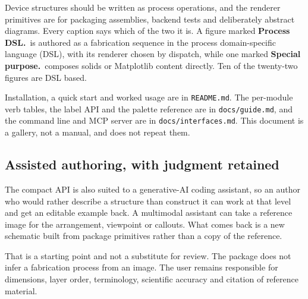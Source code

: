 \documentclass[11pt]{article}
\newcommand{\packagefile}[1]{\texttt{#1}}
\newcommand{\kinddsl}{\textcolor{lineblue}{\textbf{Process DSL.}}\ }
\newcommand{\kindspecial}{\textcolor{slate}{\textbf{Special purpose.}}\ }
\begin{document}
Device structures should be written as process operations, and the renderer
primitives are for packaging assemblies, backend tests and deliberately
abstract diagrams. Every caption says which of the two it is. A figure marked
\kinddsl is authored as a fabrication sequence in the process domain-specific
language (DSL), with its renderer chosen by dispatch, while one marked
\kindspecial composes solids or Matplotlib content directly. Ten of the twenty-two figures are DSL based.

Installation, a quick start and worked usage are in \packagefile{README.md}.
The per-module verb tables, the label API and the palette reference are in
\packagefile{docs/guide.md}, and the command line and MCP server are in
\packagefile{docs/interfaces.md}. This document is a gallery, not a manual,
and does not repeat them.

\subsection*{Assisted authoring, with judgment retained}

The compact API is also suited to a generative-AI coding assistant, so an
author who would rather describe a structure than construct it can work at
that level and get an editable example back. A multimodal assistant can take
a reference image for the arrangement, viewpoint or callouts. What comes back
is a new schematic built from package primitives rather than a copy of the
reference.

That is a starting point and not a substitute for review. The package does not
infer a fabrication process from an image. The user remains responsible for
dimensions, layer order, terminology, scientific accuracy and citation of
reference material.

\begin{center}
\end{center}
\end{document}

